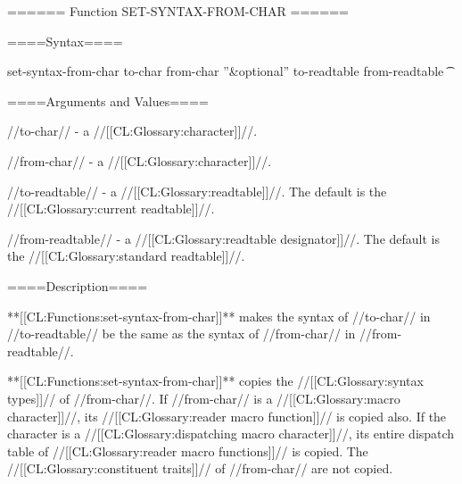 ====== Function SET-SYNTAX-FROM-CHAR ======

====Syntax====

\DefunWithValues set-syntax-from-char {to-char from-char ''&optional'' to-readtable from-readtable} {\t}

====Arguments and Values====

//to-char// - a //[[CL:Glossary:character]]//.

//from-char// - a //[[CL:Glossary:character]]//.

//to-readtable// - a //[[CL:Glossary:readtable]]//. The default is the //[[CL:Glossary:current readtable]]//.

//from-readtable// - a //[[CL:Glossary:readtable designator]]//. The default is the //[[CL:Glossary:standard readtable]]//.

====Description====

**[[CL:Functions:set-syntax-from-char]]** makes the syntax of //to-char// in //to-readtable// be the same as the syntax of //from-char// in //from-readtable//.

**[[CL:Functions:set-syntax-from-char]]** copies the //[[CL:Glossary:syntax types]]// of //from-char//. If //from-char// is a //[[CL:Glossary:macro character]]//, its //[[CL:Glossary:reader macro function]]// is copied also. If the character is a //[[CL:Glossary:dispatching macro character]]//, its entire dispatch table of //[[CL:Glossary:reader macro functions]]// is copied. The //[[CL:Glossary:constituent traits]]// of //from-char// are not copied.

